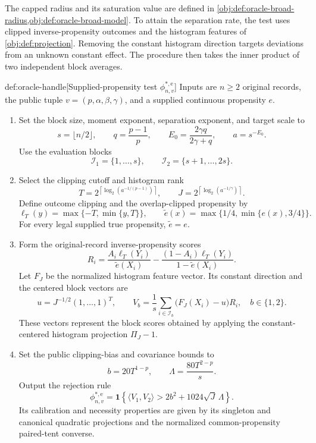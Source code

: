 The capped radius  and its saturation value  are defined in \cref{obj:def:oracle-broad-radius,obj:def:oracle-broad-model}. To attain the separation rate, the test uses clipped inverse-propensity outcomes and the histogram features of \cref{obj:def:projection}. Removing the constant histogram direction targets deviations from an unknown constant effect. The procedure then takes the inner product of two independent block averages.

\begin{algorithmv}{def:oracle-handle}[Supplied-propensity test \(\phi^{*,\mathrm e}_{n,v}\)]
Inputs are \(n\ge2\) original records, the public tuple \(v=(p,\alpha,\beta,\gamma)\), and a supplied continuous propensity \(e\).
\begin{enumerate}
\item Set the block size, moment exponent, separation exponent, and target scale to
\[
s=\lfloor n/2\rfloor,
\qquad
q=\frac{p-1}{p},
\qquad
E_0=\frac{2\gamma q}{2\gamma+q},
\qquad
a=s^{-E_0}.
\]
Use the evaluation blocks
\[
\mathcal I_1=\{1,\ldots,s\},
\qquad
\mathcal I_2=\{s+1,\ldots,2s\}.
\]
\item Select the clipping cutoff and histogram rank
\[
T=2^{\left\lceil\log_2(a^{-1/(p-1)})\right\rceil},
\qquad
J=2^{\left\lceil\log_2(a^{-1/\gamma})\right\rceil}.
\]
Define outcome clipping and the overlap-clipped propensity by
\[
\ell_T(y)=\max\{-T,\min\{y,T\}\},
\qquad
\widetilde e(x)=\max\{1/4,\min\{e(x),3/4\}\}.
\]
For every legal supplied true propensity, \(\widetilde e=e\).
\item Form the original-record inverse-propensity scores
\[
R_i=
\frac{A_i\ell_T(Y_i)}{\widetilde e(X_i)}
-
\frac{(1-A_i)\ell_T(Y_i)}{1-\widetilde e(X_i)}.
\]
Let \(F_J\) be the normalized histogram feature vector. Its constant direction and the centered block vectors are
\[
u=J^{-1/2}(1,\ldots,1)^T,
\qquad
V_b=\frac1s\sum_{i\in\mathcal I_b}
\bigl(F_J(X_i)-u\bigr)R_i,
\quad b\in\{1,2\}.
\]
These vectors represent the block scores obtained by applying the constant-centered histogram projection \(\Pi_J-1\).
\item Set the public clipping-bias and covariance bounds to
\[
b=20T^{1-p},
\qquad
\Lambda=\frac{80T^{2-p}}s.
\]
Output the rejection rule
\[
\phi^{*,\mathrm e}_{n,v}
=
\mathbf 1\!\left\{
\langle V_1,V_2\rangle
>
2b^2+1024\sqrt J\,\Lambda
\right\}.
\]
Its calibration and necessity properties are given by its singleton and canonical quadratic projections and the normalized common-propensity paired-tent converse.
\end{enumerate}
\end{algorithmv}

